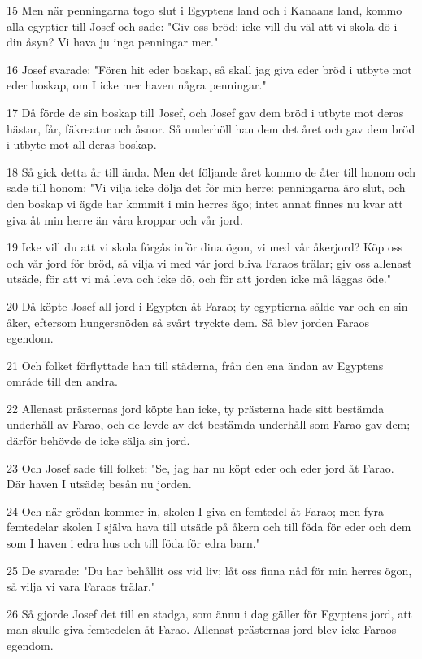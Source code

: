 \par 15 Men när penningarna togo slut i Egyptens land och i Kanaans land, kommo alla egyptier till Josef och sade: "Giv oss bröd; icke vill du väl att vi skola dö i din åsyn? Vi hava ju inga penningar mer."
\par 16 Josef svarade: "Fören hit eder boskap, så skall jag giva eder bröd i utbyte mot eder boskap, om I icke mer haven några penningar."
\par 17 Då förde de sin boskap till Josef, och Josef gav dem bröd i utbyte mot deras hästar, får, fäkreatur och åsnor. Så underhöll han dem det året och gav dem bröd i utbyte mot all deras boskap.
\par 18 Så gick detta år till ända. Men det följande året kommo de åter till honom och sade till honom: "Vi vilja icke dölja det för min herre: penningarna äro slut, och den boskap vi ägde har kommit i min herres ägo; intet annat finnes nu kvar att giva åt min herre än våra kroppar och vår jord.
\par 19 Icke vill du att vi skola förgås inför dina ögon, vi med vår åkerjord? Köp oss och vår jord för bröd, så vilja vi med vår jord bliva Faraos trälar; giv oss allenast utsäde, för att vi må leva och icke dö, och för att jorden icke må läggas öde."
\par 20 Då köpte Josef all jord i Egypten åt Farao; ty egyptierna sålde var och en sin åker, eftersom hungersnöden så svårt tryckte dem. Så blev jorden Faraos egendom.
\par 21 Och folket förflyttade han till städerna, från den ena ändan av Egyptens område till den andra.
\par 22 Allenast prästernas jord köpte han icke, ty prästerna hade sitt bestämda underhåll av Farao, och de levde av det bestämda underhåll som Farao gav dem; därför behövde de icke sälja sin jord.
\par 23 Och Josef sade till folket: "Se, jag har nu köpt eder och eder jord åt Farao. Där haven I utsäde; besån nu jorden.
\par 24 Och när grödan kommer in, skolen I giva en femtedel åt Farao; men fyra femtedelar skolen I själva hava till utsäde på åkern och till föda för eder och dem som I haven i edra hus och till föda för edra barn."
\par 25 De svarade: "Du har behållit oss vid liv; låt oss finna nåd för min herres ögon, så vilja vi vara Faraos trälar."
\par 26 Så gjorde Josef det till en stadga, som ännu i dag gäller för Egyptens jord, att man skulle giva femtedelen åt Farao. Allenast prästernas jord blev icke Faraos egendom.
